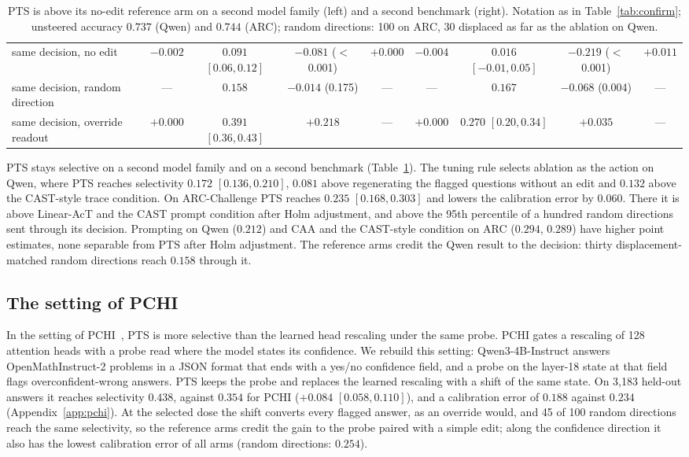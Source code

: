 \begin{table}[t]
{\begin{tabular}{l|cccc|cccc}
\hline
same decision, no edit & $-0.002$ & $0.091$ {\tiny$[0.06,0.12]$} & $-0.081$ ($<$0.001) & $+0.000$ & $-0.004$ & $0.016$ {\tiny$[-0.01,0.05]$} & $-0.219$ ($<$0.001) & $+0.011$ \\
same decision, random direction & --- & $0.158$ & $-0.014$ (0.175) & --- & --- & $0.167$ & $-0.068$ (0.004) & --- \\
same decision, override readout & $+0.000$ & $0.391$ {\tiny$[0.36,0.43]$} & $+0.218$ & --- & $+0.000$ & $0.270$ {\tiny$[0.20,0.34]$} & $+0.035$ & --- \\
\hline
\end{tabular}}
\caption{PTS is above its no-edit reference arm on a second model family
(left) and a second benchmark (right). Notation as in Table~\ref{tab:confirm};
unsteered accuracy $0.737$ (Qwen) and $0.744$ (ARC); random directions: 100 on
ARC, 30 displaced as far as the ablation on Qwen.}
\label{tab:confirm2}
\end{table}

PTS stays selective on a second model family and on a second benchmark
(Table~\ref{tab:confirm2}). The tuning rule selects ablation as the action on
Qwen, where PTS reaches selectivity $0.172$ $[0.136, 0.210]$, $0.081$ above
regenerating the flagged questions without an edit and $0.132$ above the
CAST-style trace condition. On ARC-Challenge PTS reaches $0.235$
$[0.168, 0.303]$ and lowers the calibration error by $0.060$. There it is above
Linear-AcT and the CAST prompt condition after Holm adjustment, and above the
95th percentile of a hundred random directions sent through its decision.
Prompting on Qwen ($0.212$) and CAA and the CAST-style condition on ARC
($0.294$, $0.289$) have higher point estimates, none separable from PTS after
Holm adjustment. The reference arms credit the Qwen result to the decision:
thirty displacement-matched random directions reach $0.158$ through it.

\subsection{The setting of PCHI}

In the setting of PCHI~\citep{liu2026probe}, PTS is more selective than the
learned head rescaling under the same probe. PCHI gates a rescaling of 128
attention heads with a probe read where the model states its confidence. We
rebuild this setting: Qwen3-4B-Instruct answers OpenMathInstruct-2 problems in
a JSON format that ends with a yes/no confidence field, and a probe on the
layer-18 state at that field flags overconfident-wrong answers. PTS keeps the
probe and replaces the learned rescaling with a shift of the same state. On
3{,}183 held-out answers it reaches selectivity $0.438$, against $0.354$ for
PCHI ($+0.084$ $[0.058, 0.110]$), and a calibration error of $0.188$ against
$0.234$ (Appendix~\ref{app:pchi}). At the selected dose the shift converts
every flagged answer, as an override would, and 45 of 100 random directions
reach the same selectivity, so the reference arms credit the gain to the probe
paired with a simple edit; along the confidence direction it also has the
lowest calibration error of all arms (random directions: $0.254$).

